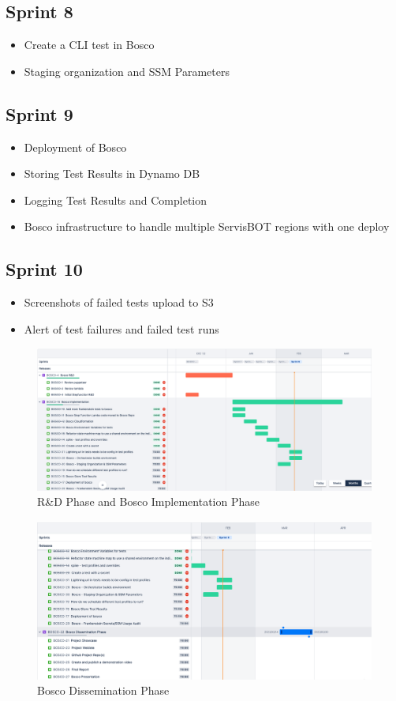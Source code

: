 \documentclass[12pt,a4paper,titlepage]{report}
\begin{document}
\subsection*{Sprint 8}
\begin{itemize}
\item Create a CLI test in Bosco
\item Staging organization and SSM Parameters
\end{itemize}

\subsection*{Sprint 9}
\begin{itemize}
\item Deployment of Bosco
\item Storing Test Results in Dynamo DB
\item Logging Test Results and Completion
\item Bosco infrastructure to handle multiple ServisBOT regions with one deploy
\end{itemize}

\subsection*{Sprint 10}
\begin{itemize}
\item Screenshots of failed tests upload to S3
\item Alert of test failures and failed test runs
\end{itemize}

\begin{figure}[ht]
 \centering
 \includegraphics[width=15cm]{./diagrams/sprints1.png}
 \caption{R\&D Phase and Bosco Implementation Phase}
\end{figure}

\begin{figure}[ht]
 \centering
 \includegraphics[width=15cm]{./diagrams/sprints2.png}
 \caption{Bosco Dissemination Phase}
\end{figure}
\end{document}
